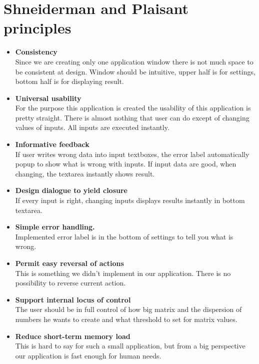 \documentclass[12pt]{report}
\begin{document}
\chapter{Shneiderman and Plaisant principles}
\begin{itemize}
    \item \textbf{Consistency} \\
    Since we are creating only one application window there is not much space to be consistent at design. Window should be intuitive, upper half is for settings, bottom half is for displaying result.
    \item \textbf{Universal usability} \\
    For the purpose this application is created the usability of this application is pretty straight. There is almost nothing that user can do except of changing values of inputs. All inputs are executed instantly.  
    \item \textbf{Informative feedback} \\
    If user writes wrong data into input textboxes, the error label automatically popup to show what is wrong with inputs. If input data are good, when changing, the textarea instantly shows result.
    \item \textbf{Design dialogue to yield closure} \\
    If every input is right, changing inputs displays results instantly in bottom textarea.
    \item \textbf{Simple error handling.} \\
    Implemented error label is in the bottom of settings to tell you what is wrong.
    \item \textbf{Permit easy reversal of actions} \\
    This is something we didn't implement in our application. There is no possibility to reverse current action.
    \item \textbf{Support internal locus of control} \\
    The user should be in full control of how big matrix and the dispersion of numbers he wants to create and what threshold to set for matrix values. 
    \item \textbf{Reduce short-term memory load} \\
    This is hard to say for such a small application, but from a big perspective our application is fast enough for human needs.
\end{itemize}
\end{document}
